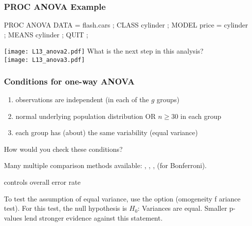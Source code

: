 \begin{frame}[fragile]
\frametitle{PROC ANOVA Example}
\footnotesize
\begin{code}{.0}
PROC ANOVA DATA = flash.cars ;
   CLASS cylinder ;
   MODEL price = cylinder ;
   MEANS cylinder ;
QUIT ;
\end{code}
\vspace{2ex}
\texttt{[image: L13\_anova2.pdf]}
\emp
{} \hspace{1in} \emp
{}
\oyo What is the next step in this analysis?\\
\vskip49pt
\texttt{[image: L13\_anova3.pdf]}
\emp
\end{frame}



\begin{frame}
\frametitle{Conditions for one-way ANOVA}
\begin{enumerate}
    \item
    observations are independent (in each of the $g$ groups)
    \item
    normal underlying population distribution OR $n \geq 30$ in each group
    \item
    each group has (about) the same variability (equal variance)
\end{enumerate}
\vskip10pt
\oyo How would you check these conditions?
\end{frame}


\begin{frame}
	\bi
	\item Many multiple comparison methods available: , , ,  (for Bonferroni).
	\item {} controls overall error rate
	\item To test the assumption of equal variance, use the  option (omogeneity f ariance test). For this test, the null hypothesis is $H_0$: Variances are equal. Smaller p-values lend stronger evidence against this statement.
	\ei
\end{frame}

